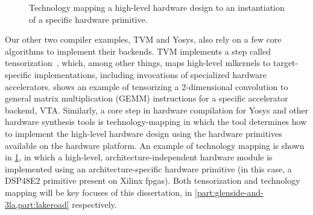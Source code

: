 \begin{figure}[]
\centering
{}
\caption{Technology mapping a high-level
  hardware design
  to an instantiation of a specific 
  hardware primitive.}
\label{fig:intro:techmapping}
\end{figure}


Our other two compiler examples,
  TVM and Yosys,
  also rely on a few core algorithms
  to implement their backends.
TVM implements a step
  called 
  \gls{tensorization}~\cite{tvmtensorization},
  which, among other things, maps high-level 
  \glspl{mlkernel}
  to target-specific implementations,
  including invocations
  of specialized hardware \glspl{accelerator}.
  shows an example of tensorizing 
  a 2-dimensional convolution
  to general matrix multiplication (GEMM) instructions
  for a specific accelerator backend, VTA.
Similarly,
  a core step in hardware compilation
  for
  Yosys and other hardware synthesis tools 
  is \gls{technology-mapping}
  in which the tool determines
  how to implement the high-level
  hardware design
  using the hardware primitives
  available on the hardware
  platform.
An example of technology mapping is shown in
  \cref{fig:intro:techmapping},
  in which a high-level, architecture-independent
  hardware module 
  is implemented using an
  architecture-specific hardware primitive
  (in this case, a DSP48E2 primitive
    present on Xilinx \glspl{fpga}).
Both tensorization
  and technology mapping
  will be key focuses of this dissertation,
  in \cref{part:glenside-and-3la,part:lakeroad}
  respectively.

